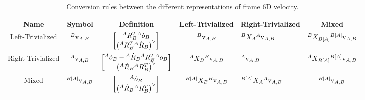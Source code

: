 \begin{table}
\small
\begin{tabular}{|c | c | c | c | m{2cm} | c |} 
 \hline
 Name & Symbol & Definition & Left-Trivialized & Right-Trivialized & Mixed \\ [0.5ex] 
 \hline
 Left-Trivialized & 
 $\hspace{0em}^B {\rm v}_{A,B}$ & 
 $\begin{bmatrix} 
 \hspace{0em}^A R_B^T \hspace{0em}^A {\dot o}_B \\
 \left( \hspace{0em}^A R_B^T \hspace{0em}^A {\dot R}_B \right)^{\vee}
 \end{bmatrix}$ &
 $\hspace{0em}^B {\rm v}_{A,B}$ & 
 $\hspace{0em}^B X_A \hspace{0em}^A {\rm v}_{A,B}$ & 
 $\hspace{0em}^B X_{B[A]} \hspace{0em}^{B[A]} {\rm v}_{A,B}$ \\
 \hline
 Right-Trivialized & 
 $\hspace{0em}^A {\rm v}_{A,B}$ & 
 $\begin{bmatrix} 
 \hspace{0em}^A {\dot o}_B - \hspace{0em}^{A} \dot{R}_{B} \hspace{0em}^A R_B^T \hspace{0em}^A o_B \\
 \left( \hspace{0em}^A {\dot R}_B \hspace{0em}^A R_B^T \right)^{\vee}
 \end{bmatrix}$ &
 $\hspace{0em}^A X_B \hspace{0em}^B {\rm v}_{A,B}$ & 
 $\hspace{0em}^A {\rm v}_{A,B}$ & 
 $\hspace{0em}^A X_{B[A]} \hspace{0em}^{B[A]} {\rm v}_{A,B}$ \\
 \hline
 Mixed & 
 $\hspace{0em}^{B[A]} {\rm v}_{A,B}$ & 
 $\begin{bmatrix} 
 \hspace{0em}^A {\dot o}_B \\
 \left( \hspace{0em}^A {\dot R}_B \hspace{0em}^A R_B^T  \right)^{\vee}
 \end{bmatrix}$ &
 $\hspace{0em}^{B[A]} X_B \hspace{0em}^B {\rm v}_{A,B}$ & 
 $\hspace{0em}^{B[A]} X_A \hspace{0em}^A {\rm v}_{A,B}$ & 
 $\hspace{0em}^{B[A]} {\rm v}_{A,B}$ \\
 \hline
\end{tabular}
\caption{Conversion rules between the different representations of frame 6D velocity.}
\label{tab:velRecap}

\bigskip\bigskip


\end{table}

